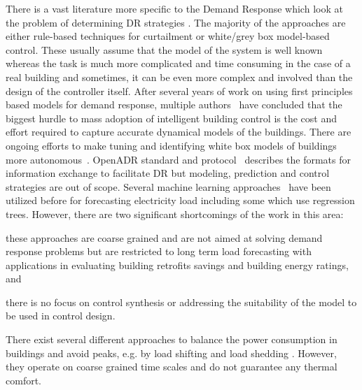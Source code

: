 There is a vast literature more specific to the Demand Response which look at the problem of determining DR strategies \cite{oldewurtel2013towards,xu2004peak}. 
The majority of the approaches are either rule-based techniques for curtailment or white/grey box model-based control. 
These usually assume that the model of the system is well known whereas the task is much more complicated and time consuming in the case of a real building and sometimes, it can be even more complex and involved than the design of the controller itself. 
After several years of work on using first principles based models for demand response, multiple authors~\cite{costmpc,reallife} have concluded that the biggest hurdle to mass adoption of intelligent building control is the cost and effort required to capture accurate dynamical models of the buildings. 
There are ongoing efforts to make tuning and identifying white box models of buildings more autonomous~\cite{new2012autotune}. 
OpenADR standard and protocol~\cite{openadr} describes the formats for information exchange to facilitate DR but modeling, prediction and control strategies are out of scope. 
Several machine learning approaches~\cite{edwards2012predicting,vaghefi2014modeling,yin2012scalable} have been utilized before for forecasting electricity load including some which use regression trees. 
However, there are two significant shortcomings of the work in this area: 
	\begin{inparaenum}[(a)]
		\item these approaches are coarse grained and  are not aimed at solving demand response problems but are restricted to long term load forecasting with applications in evaluating building retrofits savings and building energy ratings, and
		\item  there is no focus on control synthesis or addressing the suitability of the model to be used in control design. 
	\end{inparaenum}
	There exist several different approaches to balance the power consumption in buildings and avoid peaks, e.g. by load shifting and load shedding \cite{KiliccoteEtAl06aca,LeeEtAl08dom}. However, they operate on coarse grained time scales and do not guarantee any thermal comfort.

